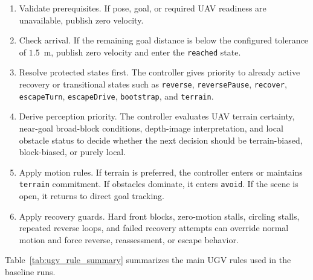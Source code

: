 \begin{enumerate}
\item Validate prerequisites. If pose, goal, or required UAV readiness are unavailable, publish zero velocity.
\item Check arrival. If the remaining goal distance is below the configured tolerance of $1.5$~m, publish zero velocity and enter the \texttt{reached} state.
\item Resolve protected states first. The controller gives priority to already active recovery or transitional states such as \texttt{reverse}, \texttt{reversePause}, \texttt{recover}, \texttt{escapeTurn}, \texttt{escapeDrive}, \texttt{bootstrap}, and \texttt{terrain}.
\item Derive perception priority. The controller evaluates UAV terrain certainty, near-goal broad-block conditions, depth-image interpretation, and local obstacle status to decide whether the next decision should be terrain-biased, block-biased, or purely local.
\item Apply motion rules. If terrain is preferred, the controller enters or maintains \texttt{terrain} commitment. If obstacles dominate, it enters \texttt{avoid}. If the scene is open, it returns to direct goal tracking.
\item Apply recovery guards. Hard front blocks, zero-motion stalls, circling stalls, repeated reverse loops, and failed recovery attempts can override normal motion and force reverse, reassessment, or escape behavior.
\end{enumerate}

Table~\ref{tab:ugv_rule_summary} summarizes the main UGV rules used in the baseline runs.


